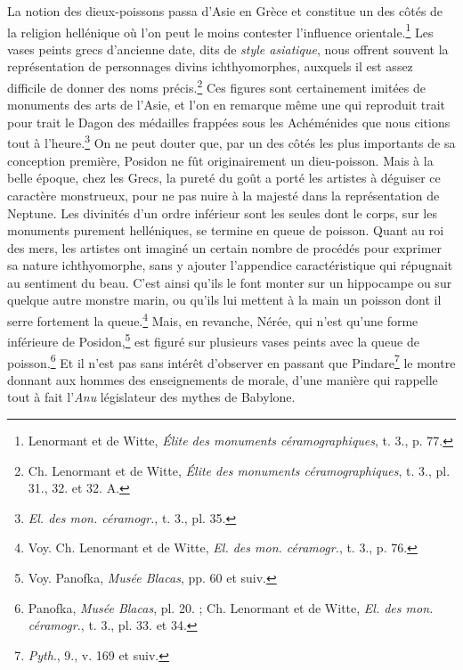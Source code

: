\documentclass[a4paper, 11pt, oneside, landscape]{article}
\begin{document}
La notion des dieux-poissons passa d'Asie en Grèce et constitue un des côtés de la religion hellénique où l'on peut le moins contester l'influence orientale.\footnote{Lenormant et de Witte, \emph{Élite des monuments céramographiques}, t. 3., p. 77.} Les vases peints grecs d'ancienne date, dits de \emph{style asiatique}, nous offrent souvent la représentation de personnages divins ichthyomorphes, auxquels il est assez difficile de donner des noms précis.\footnote{Ch. Lenormant et de Witte, \emph{Élite des monuments céramographiques}, t. 3., pl. 31., 32. et 32. A.} Ces figures sont certainement imitées de monuments des arts de l'Asie, et l'on en remarque même une qui reproduit trait pour trait le Dagon des médailles frappées sous les Achéménides que nous citions tout à l'heure.\footnote{\emph{El. des mon. céramogr.}, t. 3., pl. 35.} On ne peut douter que, par un des côtés les plus importants de sa conception première, Posidon ne fût originairement un dieu-poisson. Mais à la belle époque, chez les Grecs, la pureté du goût a porté les artistes à déguiser ce caractère monstrueux, pour ne pas nuire à la majesté dans la représentation de Neptune. Les divinités d'un ordre inférieur sont les seules dont le corps, sur les monuments purement helléniques, se termine en queue de poisson. Quant au roi des mers, les artistes ont imaginé un certain nombre de procédés pour exprimer sa nature ichthyomorphe, sans y ajouter l'appendice caractéristique qui répugnait au sentiment du beau. C'est ainsi qu'ils le font monter sur un hippocampe ou sur quelque autre monstre marin, ou qu'ils lui mettent à la main un poisson dont il serre fortement la queue.\footnote{Voy. Ch. Lenormant et de Witte, \emph{El. des mon. céramogr.}, t. 3., p. 76.} Mais, en revanche, Nérée, qui n'est qu'une forme inférieure de Posidon,\footnote{Voy. Panofka, \emph{Musée Blacas}, pp. 60 et suiv.} est figuré sur plusieurs vases peints avec la queue de poisson.\footnote{Panofka, \emph{Musée Blacas}, pl. 20. ; Ch. Lenormant et de Witte, \emph{El. des mon. céramogr.}, t. 3., pl. 33. et 34.} Et il n'est pas sans intérêt d'observer en passant que Pindare\footnote{\emph{Pyth}., 9., v. 169 et suiv.} le montre donnant aux hommes des enseignements de morale, d'une manière qui rappelle tout à fait l'\emph{Anu} législateur des mythes de Babylone.
\end{document}
